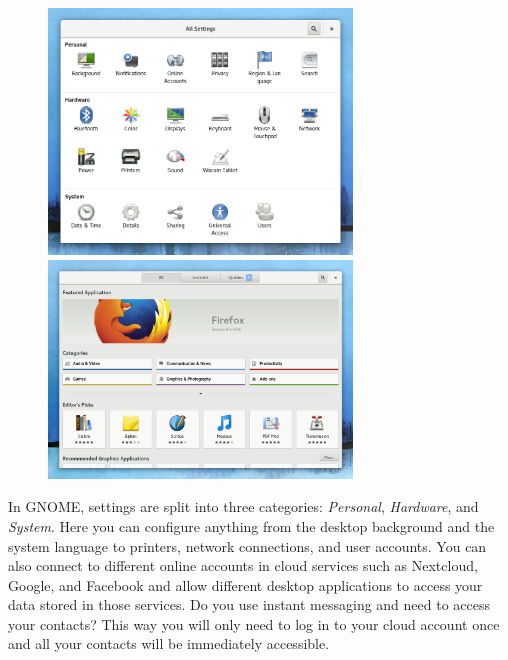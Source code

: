 \begin{figure}[p]
\begin{center}
\includegraphics[width=0.72\textwidth]{img/settings}
 \label{fig:settings}
\bigskip
\includegraphics[width=0.72\textwidth]{img/software}
 \label{fig:software}
\end{center}
\end{figure}

In GNOME, settings are split into three categories: \emph{Personal}, \emph{Hardware}, and \emph{System}. Here you can configure anything from the desktop background and the system language to printers, network connections, and user accounts. You can also connect to different online accounts in cloud services such as Nextcloud, Google, and Facebook and allow different desktop applications to access your data stored in those services. Do you use instant messaging and need to access your contacts? This way you will only need to log in to your cloud account once and all your contacts will be immediately accessible.

